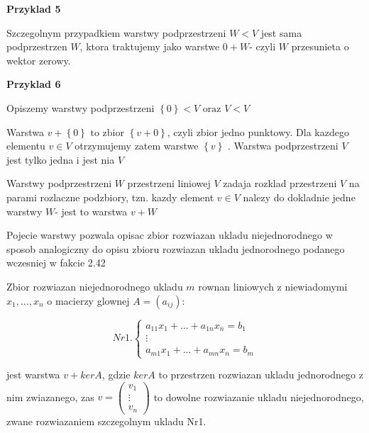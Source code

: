 \documentclass{article}
\begin{document}
\textbf{Przyklad 5}

Szczegolnym przypadkiem warstwy podprzestrzeni $W<V$ jest sama podprzestrzen $W$, ktora traktujemy jako warstwe $0 + W$- czyli $W$ przesunieta o wektor zerowy.

\textbf{Przyklad 6}

Opiszemy warstwy podprzestrzeni $\left\{ 0 \right\} < V \text{ oraz } V < V$

Warstwa $v + \left\{0\right\} \text{ to zbior } \left\{v+0\right\}$, czyli zbior jedno punktowy. Dla kazdego elementu $v \in V$ otrzymujemy zatem warstwe $\left\{v\right\}$ . Warstwa podprzestrzeni $V$ jest tylko jedna i jest nia $V$

\begin{tcolorbox}[colback=white!90!green,colframe=black!35!green,title=Fakt 2.44 Warstwy podprzestrzeni]

Warstwy podprzestrzeni $W$ przestrzeni liniowej $V$ zadaja rozklad przestrzeni $V$ na parami rozlaczne podzbiory, tzn. kazdy element $v \in V$ nalezy do dokladnie jedne warstwy $W$- jest to warstwa $v + W$

\end{tcolorbox}

\vspace{5mm}
Pojecie warstwy pozwala opisac zbior rozwiazan ukladu niejednorodnego w sposob analogiczny do opisu zbioru rozwiazan ukladu jednorodnego podanego wczesniej w fakcie 2.42

\begin{tcolorbox}[colback=white!90!green,colframe=black!35!green,title=Fakt 2.45 Zbior rozwiazan ukladu niejednorodnego]

Zbior rozwiazan niejednorodnego ukladu $m$ rownan liniowych z niewiadomymi $x_{1},...,x_{n}$ o macierzy glownej $A = (a_{ij})$:

$$
Nr 1.
\begin{cases}
a_{11}x_{1} + ... + a_{1n}x_{n} = b_{1} \\
\vdots \\
a_{m1}x_{1} + ... + a_{mn}x_{n} = b_{m}
\end{cases}
$$

jest warstwa $v + kerA$, gdzie $kerA$ to przestrzen rozwiazan ukladu jednorodnego z nim zwiazanego, zas $v = \begin{pmatrix} v_{1} \\ \vdots \\ v_{n} \end{pmatrix}$ to dowolne rozwiazanie ukladu niejednorodnego, zwane rozwiazaniem szczegolnym ukladu Nr1.

\end{tcolorbox}
\end{document}
